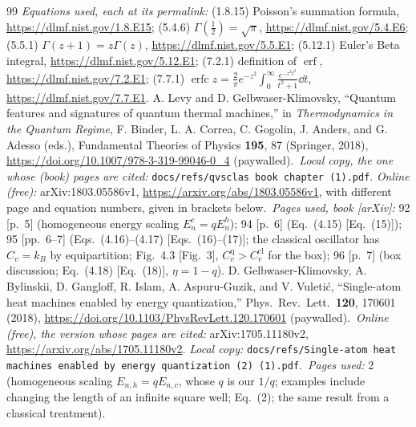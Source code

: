 \documentclass[11pt]{article}
\numberwithin{equation}{section}
\providecommand{\erf}{\operatorname{erf}}
\providecommand{\erfc}{\operatorname{erfc}}
\newcommand{\Cq}{C_v^{\mathrm{q}}}
\newcommand{\Ccl}{C_v^{\mathrm{cl}}}
\newcommand{\kB}{k_{B}}
\begin{document}
\begin{thebibliography}{99}
\emph{Equations used, each at its permalink:} (1.8.15) Poisson's summation formula, \url{https://dlmf.nist.gov/1.8.E15}; (5.4.6) $\Gamma(\frac12)=\sqrt\pi$, \url{https://dlmf.nist.gov/5.4.E6}; (5.5.1) $\Gamma(z+1)=z\Gamma(z)$, \url{https://dlmf.nist.gov/5.5.E1}; (5.12.1) Euler's Beta integral, \url{https://dlmf.nist.gov/5.12.E1}; (7.2.1) definition of $\erf$, \url{https://dlmf.nist.gov/7.2.E1}; (7.7.1) $\erfc z=\frac{2}{\pi}e^{-z^2}\int_0^\infty\frac{e^{-z^2t^2}}{t^2+1}\dd t$, \url{https://dlmf.nist.gov/7.7.E1}.
 A. Levy and D. Gelbwaser-Klimovsky, ``Quantum features and signatures of quantum thermal machines,'' in \emph{Thermodynamics in the Quantum Regime}, F. Binder, L. A. Correa, C. Gogolin, J. Anders, and G. Adesso (eds.), Fundamental Theories of Physics \textbf{195}, 87 (Springer, 2018), \url{https://doi.org/10.1007/978-3-319-99046-0_4} (paywalled).\
\emph{Local copy, the one whose (book) pages are cited:} \texttt{docs/refs/qvsclas book chapter (1).pdf}. \emph{Online (free):} arXiv:1803.05586v1, \url{https://arxiv.org/abs/1803.05586v1}, with different page and equation numbers, given in brackets below.\
\emph{Pages used, book [arXiv]:} 92 [p.~5] (homogeneous energy scaling $E^c_n=qE^h_n$); 94 [p.~6] (Eq.~(4.15) [Eq.~(15)]); 95 [pp.~6--7] (Eqs.~(4.16)--(4.17) [Eqs.~(16)--(17)]; the classical oscillator has $C_v=\kB$ by equipartition; Fig.~4.3 [Fig.~3], $\Cq>\Ccl$ for the box); 96 [p.~7] (box discussion; Eq.~(4.18) [Eq.~(18)], $\eta=1-q$).
\bibitem{GK} D. Gelbwaser-Klimovsky, A. Bylinskii, D. Gangloff, R. Islam, A. Aspuru-Guzik, and V. Vuleti\'c, ``Single-atom heat machines enabled by energy quantization,'' Phys.\ Rev.\ Lett.\ \textbf{120}, 170601 (2018), \url{https://doi.org/10.1103/PhysRevLett.120.170601} (paywalled).\
\emph{Online (free), the version whose pages are cited:} arXiv:1705.11180v2, \url{https://arxiv.org/abs/1705.11180v2}. \emph{Local copy:} \texttt{docs/refs/Single-atom heat machines enabled by energy quantization (2) (1).pdf}.\
\emph{Pages used:} 2 (homogeneous scaling $E_{n,h}=qE_{n,c}$, whose $q$ is our $1/q$; examples include changing the length of an infinite square well; Eq.~(2); the same result from a classical treatment).
\end{thebibliography}
\end{document}
